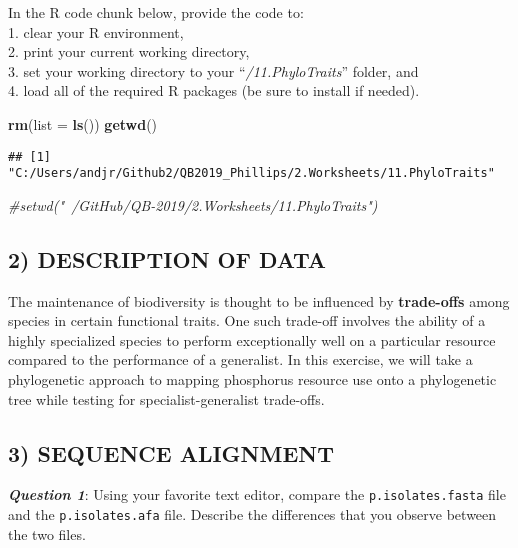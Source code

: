 \documentclass[]{article}
\newenvironment{Shaded}{\begin{snugshade}}{\end{snugshade}}
\newcommand{\KeywordTok}[1]{\textcolor[rgb]{0.13,0.29,0.53}{\textbf{#1}}}
\newcommand{\DataTypeTok}[1]{\textcolor[rgb]{0.13,0.29,0.53}{#1}}
\newcommand{\CommentTok}[1]{\textcolor[rgb]{0.56,0.35,0.01}{\textit{#1}}}
\newcommand{\NormalTok}[1]{#1}
\begin{document}
In the R code chunk below, provide the code to:\\
1. clear your R environment,\\
2. print your current working directory,\\
3. set your working directory to your ``\emph{/11.PhyloTraits}'' folder,
and\\
4. load all of the required R packages (be sure to install if needed).

\begin{Shaded}
\begin{Highlighting}[]
\KeywordTok{rm}\NormalTok{(}\DataTypeTok{list =} \KeywordTok{ls}\NormalTok{())}
\KeywordTok{getwd}\NormalTok{()}
\end{Highlighting}
\end{Shaded}

\begin{verbatim}
## [1] "C:/Users/andjr/Github2/QB2019_Phillips/2.Worksheets/11.PhyloTraits"
\end{verbatim}

\begin{Shaded}
\begin{Highlighting}[]
\CommentTok{#setwd("~/GitHub/QB-2019/2.Worksheets/11.PhyloTraits")}
\end{Highlighting}
\end{Shaded}

\subsection{2) DESCRIPTION OF DATA}\label{description-of-data}

The maintenance of biodiversity is thought to be influenced by
\textbf{trade-offs} among species in certain functional traits. One such
trade-off involves the ability of a highly specialized species to
perform exceptionally well on a particular resource compared to the
performance of a generalist. In this exercise, we will take a
phylogenetic approach to mapping phosphorus resource use onto a
phylogenetic tree while testing for specialist-generalist trade-offs.

\subsection{3) SEQUENCE ALIGNMENT}\label{sequence-alignment}

\textbf{\emph{Question 1}}: Using your favorite text editor, compare the
\texttt{p.isolates.fasta} file and the \texttt{p.isolates.afa} file.
Describe the differences that you observe between the two files.
\end{document}
